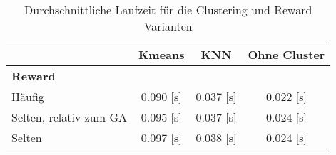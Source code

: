 \begin{table}[ht]
\caption{Durchschnittliche Laufzeit für die Clustering und Reward Varianten}
\centering
\label{tab:zeiten_testing}
\begin{tabular}{lccc}
\hline
\textbf{} & \textbf{Kmeans} & \textbf{KNN} & \textbf{Ohne Cluster} \\
\hline
\multicolumn{4}{l}{\textbf{Reward}} \\
\hspace{1em}Häufig & 0.090 [s] & 0.037 [s] & 0.022 [s] \\
\hspace{1em}Selten, relativ zum GA & 0.095 [s] & 0.037 [s] & 0.024 [s] \\
\hspace{1em}Selten & 0.097 [s] & 0.038 [s] & 0.024 [s] \\
\hline
\end{tabular}
\end{table}

